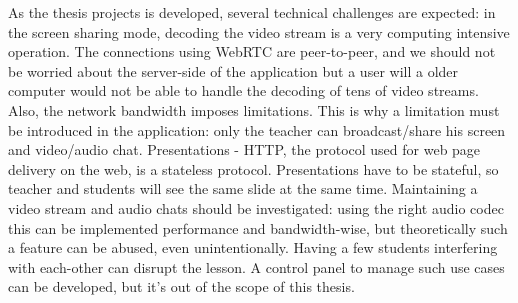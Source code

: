 As the thesis projects is developed, several technical challenges are expected:
in the screen sharing mode, decoding the video stream is a very computing
intensive operation. The connections using WebRTC are peer-to-peer, and  we
should not be worried about the server-side of the application but a user will
a older computer would not be able to handle the decoding of tens of video
streams. Also, the network bandwidth imposes limitations. This is why a
limitation must be introduced in the application: only the teacher can
broadcast/share his screen and video/audio chat. Presentations - HTTP, the
protocol used for web page delivery on the web, is a stateless protocol.
Presentations have to be stateful, so teacher and students will see the same
slide at the same time. Maintaining a video stream and audio chats should be
investigated: using the right audio codec this can be implemented performance
and bandwidth-wise, but theoretically such a feature can be abused, even
unintentionally. Having a few students interfering with each-other can disrupt
the lesson. A control panel to manage such use cases can be developed, but it's
out of the scope of this thesis.


